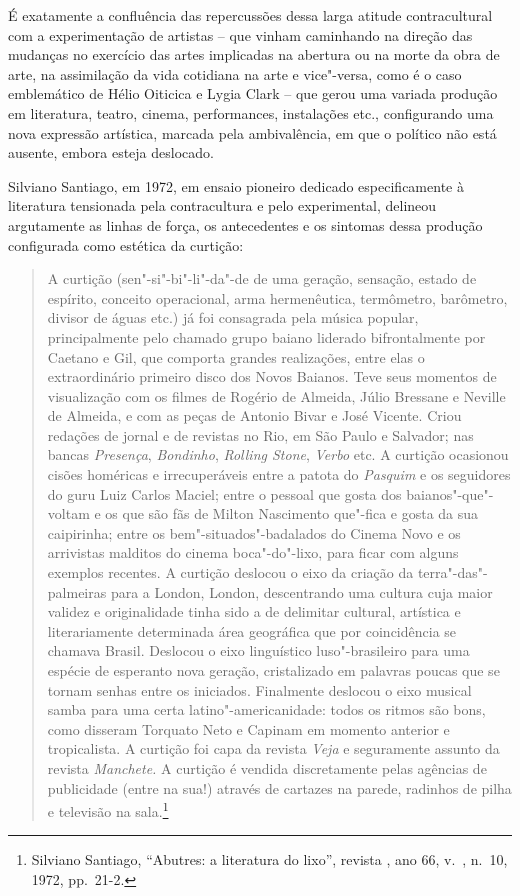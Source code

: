 É exatamente a confluência das repercussões dessa larga atitude
contracultural com a experimentação de artistas -- que vinham caminhando
na direção das mudanças no exercício das artes implicadas na abertura ou
na morte da obra de arte, na assimilação da vida cotidiana na arte e
vice"-versa, como é o caso emblemático de Hélio Oiticica e Lygia Clark --
que gerou uma variada produção em literatura, teatro, cinema,
performances, instalações etc., configurando uma nova expressão
artística, marcada pela ambivalência, em que o político não está
ausente, embora esteja deslocado.

\asterisc

Silviano Santiago, em 1972, em ensaio pioneiro dedicado especificamente
à literatura tensionada pela contracultura e pelo experimental, delineou
argutamente as linhas de força, os antecedentes e os sintomas dessa
produção configurada como estética da curtição:

\begin{quote}
A curtição (sen"-si"-bi"-li"-da"-de de uma geração, sensação, estado de
espírito, conceito operacional, arma hermenêutica, termômetro,
barômetro, divisor de águas etc.) já foi consagrada pela música popular,
principalmente pelo chamado grupo baiano liderado bifrontalmente por
Caetano e Gil, que comporta grandes realizações, entre elas o
extraordinário primeiro disco dos Novos Baianos. Teve seus momentos de
visualização com os filmes de Rogério de Almeida, Júlio Bressane e
Neville de Almeida, e com as peças de Antonio Bivar e José Vicente.
Criou redações de jornal e de revistas no Rio, em São Paulo e Salvador;
nas bancas \emph{Presença}, \emph{Bondinho}, \emph{Rolling Stone},
\emph{Verbo} etc. A curtição ocasionou cisões homéricas e irrecuperáveis
entre a patota do \emph{Pasquim} e os seguidores do guru Luiz Carlos
Maciel; entre o pessoal que gosta dos baianos"-que"-voltam e os que são
fãs de Milton Nascimento que"-fica e gosta da sua caipirinha; entre os
bem"-situados"-badalados do Cinema Novo e os arrivistas malditos do cinema
boca"-do"-lixo, para ficar com alguns exemplos recentes. A curtição
deslocou o eixo da criação da terra"-das"-palmeiras para a London, London,
descentrando uma cultura cuja maior validez e originalidade tinha sido a
de delimitar cultural, artística e literariamente determinada área
geográfica que por coincidência se chamava Brasil. Deslocou o eixo
linguístico luso"-brasileiro para uma espécie de esperanto nova geração,
cristalizado em palavras poucas que se tornam senhas entre os iniciados.
Finalmente deslocou o eixo musical samba para uma certa
latino"-americanidade: todos os ritmos são bons, como disseram Torquato
Neto e Capinam em momento anterior e tropicalista. A curtição foi capa
da revista \emph{Veja} e seguramente assunto da revista \emph{Manchete.}
A curtição é vendida discretamente pelas agências de publicidade (entre
na sua!) através de cartazes na parede, radinhos de pilha e televisão na
sala.\footnote{Silviano Santiago, ``Abutres: a literatura do lixo'',
revista {}, ano 66, v.~, n.~10, 1972, pp.~21-2.}
\end{quote}

